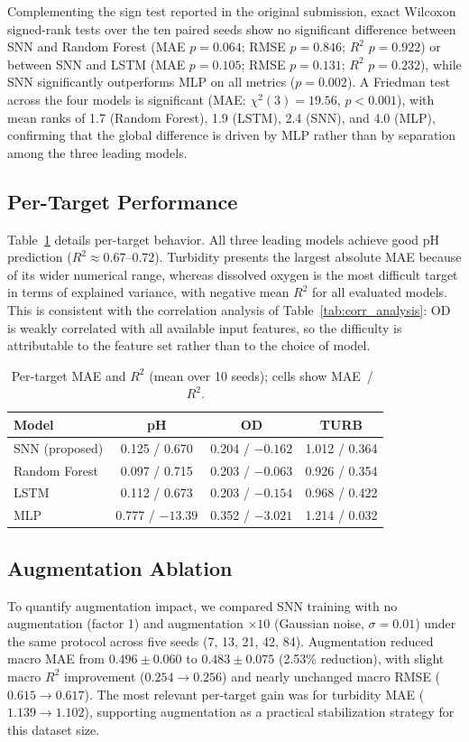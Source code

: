 Complementing the sign test reported in the original submission, exact Wilcoxon signed-rank tests over the ten paired seeds show no significant difference between SNN and Random Forest (MAE $p=0.064$; RMSE $p=0.846$; $R^2$ $p=0.922$) or between SNN and LSTM (MAE $p=0.105$; RMSE $p=0.131$; $R^2$ $p=0.232$), while SNN significantly outperforms MLP on all metrics ($p=0.002$). A Friedman test across the four models is significant (MAE: $\chi^2(3)=19.56$, $p<0.001$), with mean ranks of 1.7 (Random Forest), 1.9 (LSTM), 2.4 (SNN), and 4.0 (MLP), confirming that the global difference is driven by MLP rather than by separation among the three leading models.

\subsection{Per-Target Performance}
Table~\ref{tab:per_target} details per-target behavior. All three leading models achieve good pH prediction ($R^2 \approx 0.67$--$0.72$). Turbidity presents the largest absolute MAE because of its wider numerical range, whereas dissolved oxygen is the most difficult target in terms of explained variance, with negative mean $R^2$ for all evaluated models. This is consistent with the correlation analysis of Table~\ref{tab:corr_analysis}: OD is weakly correlated with all available input features, so the difficulty is attributable to the feature set rather than to the choice of model.

\begin{table}[!htbp]
\caption{Per-target MAE and $R^2$ (mean over 10 seeds); cells show MAE~/~$R^2$.}
\label{tab:per_target}
\centering
\footnotesize
\setlength{\tabcolsep}{3pt}
\begin{tabular}{lccc}
\toprule
Model & pH & OD & TURB \\
\midrule
SNN (proposed) & 0.125 / 0.670 & 0.204 / $-0.162$ & 1.012 / 0.364 \\
Random Forest & 0.097 / 0.715 & 0.203 / $-0.063$ & 0.926 / 0.354 \\
LSTM & 0.112 / 0.673 & 0.203 / $-0.154$ & 0.968 / 0.422 \\
MLP & 0.777 / $-13.39$ & 0.352 / $-3.021$ & 1.214 / 0.032 \\
\bottomrule
\end{tabular}
\end{table}

\subsection{Augmentation Ablation}
To quantify augmentation impact, we compared SNN training with no augmentation (factor 1) and augmentation $\times 10$ (Gaussian noise, $\sigma=0.01$) under the same protocol across five seeds (7, 13, 21, 42, 84). Augmentation reduced macro MAE from $0.496 \pm 0.060$ to $0.483 \pm 0.075$ (2.53\% reduction), with slight macro $R^2$ improvement ($0.254 \rightarrow 0.256$) and nearly unchanged macro RMSE ($0.615 \rightarrow 0.617$). The most relevant per-target gain was for turbidity MAE ($1.139 \rightarrow 1.102$), supporting augmentation as a practical stabilization strategy for this dataset size.

